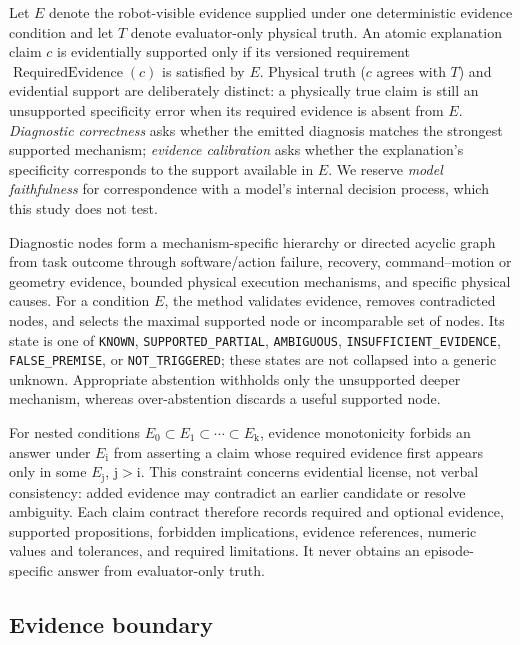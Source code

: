 \documentclass[conference]{IEEEtran}
\begin{document}
Let $E$ denote the robot-visible evidence supplied under one deterministic evidence condition and
let $T$ denote evaluator-only physical truth. An atomic explanation claim $c$ is evidentially
supported only if its versioned requirement $\operatorname{RequiredEvidence}(c)$ is satisfied by
$E$. Physical truth ($c$ agrees with $T$) and evidential support are deliberately distinct: a
physically true claim is still an unsupported specificity error when its required evidence is
absent from $E$. \emph{Diagnostic correctness} asks whether the emitted diagnosis matches the
strongest supported mechanism; \emph{evidence calibration} asks whether the explanation's
specificity corresponds to the support available in $E$. We reserve \emph{model faithfulness} for
correspondence with a model's internal decision process, which this study does not test.

Diagnostic nodes form a mechanism-specific hierarchy or directed acyclic graph from task outcome
through software/action failure, recovery, command--motion or geometry evidence, bounded physical
execution mechanisms, and specific physical causes. For a condition $E$, the method validates
evidence, removes contradicted nodes, and selects the maximal supported node or incomparable set of
nodes. Its state is one of \texttt{KNOWN}, \texttt{SUPPORTED\_PARTIAL}, \texttt{AMBIGUOUS},
\texttt{INSUFFICIENT\_EVIDENCE}, \texttt{FALSE\_PREMISE}, or \texttt{NOT\_TRIGGERED}; these states
are not collapsed into a generic unknown. Appropriate abstention withholds only the unsupported
deeper mechanism, whereas over-abstention discards a useful supported node.

For nested conditions $E_0\subset E_1\subset\cdots\subset E_{\mathrm{k}}$, evidence monotonicity forbids an
answer under $E_{\mathrm{i}}$ from asserting a claim whose required evidence first appears only in some
$E_{\mathrm{j}}$, $\mathrm{j}>\mathrm{i}$. This constraint concerns evidential license, not verbal consistency: added evidence
may contradict an earlier candidate or resolve ambiguity. Each claim contract therefore records
required and optional evidence, supported propositions, forbidden implications, evidence
references, numeric values and tolerances, and required limitations. It never obtains an
episode-specific answer from evaluator-only truth.

\subsection{Evidence boundary}
\end{document}
